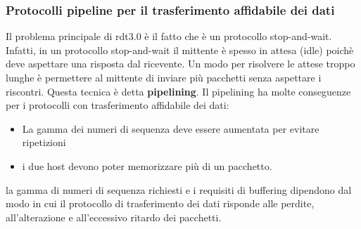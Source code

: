 \documentclass[11pt,a4paper]{article}
\begin{document}
\subsubsection{Protocolli pipeline per il trasferimento affidabile dei dati}
Il problema principale di rdt3.0 è il fatto che è un protocollo stop-and-wait. Infatti, in un protocollo stop-and-wait il mittente è spesso in attesa (idle) poichè deve aspettare una risposta dal ricevente. Un modo per risolvere le attese troppo lunghe è permettere al mittente di inviare più pacchetti senza aspettare i riscontri. Questa tecnica è detta \textbf{pipelining}. Il pipelining ha molte conseguenze per i protocolli con trasferimento affidabile dei dati:
\begin{itemize}
	\item La gamma dei numeri di sequenza deve essere aumentata per evitare ripetizioni
	\item i due host devono poter memorizzare più di un pacchetto.
\end{itemize}
la gamma di numeri di sequenza richiesti e i requisiti di buffering dipendono dal modo in cui il protocollo di trasferimento dei dati risponde alle perdite, all'alterazione e all'eccessivo ritardo dei pacchetti.
\end{document}
